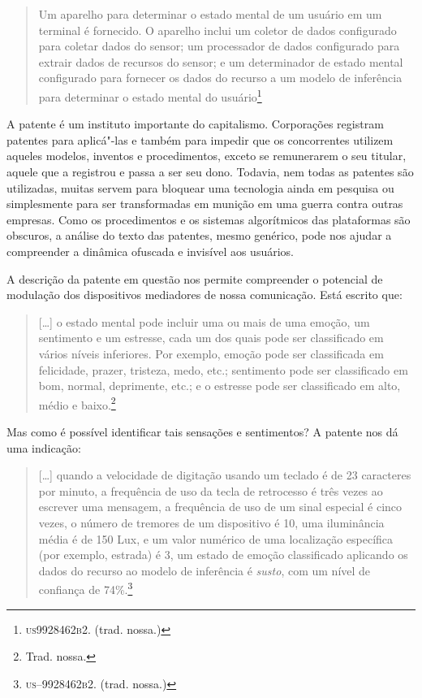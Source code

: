 \begin{quote}
Um aparelho para determinar o estado mental de um usuário em um terminal
é fornecido. O aparelho inclui um coletor de dados configurado para
coletar dados do sensor; um processador de dados configurado para
extrair dados de recursos do sensor; e um determinador de estado mental
configurado para fornecer os dados do recurso a um modelo de inferência
para determinar o estado mental do usuário\footnote{\textsc{us9928462b2}. (trad. nossa.)}
\end{quote}

A patente é um instituto importante do capitalismo. Corporações
registram patentes para aplicá"-las e também para impedir que os
concorrentes utilizem aqueles modelos, inventos e procedimentos, exceto
se remunerarem o seu titular, aquele que a registrou e passa a ser seu
dono. Todavia, nem todas as patentes são utilizadas, muitas servem para
bloquear uma tecnologia ainda em pesquisa ou simplesmente para ser
transformadas em munição em uma guerra contra outras empresas. Como os
procedimentos e os sistemas algorítmicos das plataformas são obscuros, a
análise do texto das patentes, mesmo genérico, pode nos ajudar a
compreender a dinâmica ofuscada e invisível aos usuários.

A descrição da patente em questão nos permite compreender o potencial de
modulação dos dispositivos mediadores de nossa comunicação. Está escrito
que:

\begin{quote}
{[}\ldots{}{]} o estado mental pode incluir uma ou mais de uma emoção, um
sentimento e um estresse, cada um dos quais pode ser classificado em
vários níveis inferiores. Por exemplo, emoção pode ser classificada em
felicidade, prazer, tristeza, medo, etc.; sentimento pode ser
classificado em bom, normal, deprimente, etc.; e o estresse pode ser
classificado em alto, médio e baixo.\footnote{Trad. nossa.}
\end{quote}

Mas como é possível identificar tais sensações e sentimentos? A patente
nos dá uma indicação:

\begin{quote}
{[}\ldots{}{]} quando a velocidade de digitação usando um teclado é de 23
caracteres por minuto, a frequência de uso da tecla de retrocesso é três
vezes ao escrever uma mensagem, a frequência de uso de um sinal especial
é cinco vezes, o número de tremores de um dispositivo é 10, uma
iluminância média é de 150 Lux, e um valor numérico de uma localização
específica (por exemplo, estrada) é 3, um estado de emoção classificado
aplicando os dados do recurso ao modelo de inferência é \textit{susto}, com
um nível de confiança de 74\%.\footnote{\textsc{us--9928462b2}. (trad. nossa.)} 
\end{quote}

